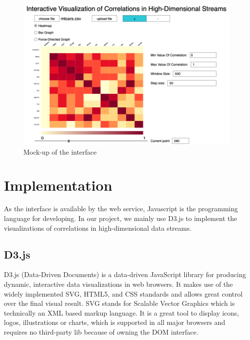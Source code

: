 \begin{figure}[h]
	\centering
	\includegraphics[width=15cm]{pictures/mockup}
	\caption{Mock-up of the interface}
	\label{fig:mockup}
\end{figure}

\section{Implementation}
\label{sec:Interface:Implementation}
As the interface is available by the web service, Javascript is the programming language for developing. In our project, we mainly use D3.js to implement the visualizations of correlations in high-dimensional data streams.
\subsection{D3.js}
\label{sec:Visualization:D3.js}
D3.js (Data-Driven Documents)\cite{D3} is a data-driven JavaScript library for producing dynamic, interactive data visualizations in web browsers. It makes use of the widely implemented SVG, HTML5, and CSS standards and allows great control over the final visual result. SVG stands for Scalable Vector Graphics which is technically an XML based markup language. It is a great tool to display icons, logos, illustrations or charts, which is supported in all major browsers and requires no third-party lib because of owning the DOM interface.\\


